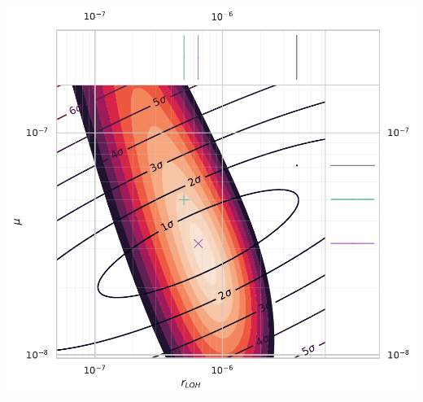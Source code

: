 \documentclass{beamer}
\begin{document}
\begin{frame}
\begin{columns}
\begin{column}{0.5\textwidth}
        \includegraphics[width=\textwidth]{figures/scatterplot_floating_mutrates_fixed_100}
        \end{column}
    \end{columns}
\end{frame}

\end{document}
